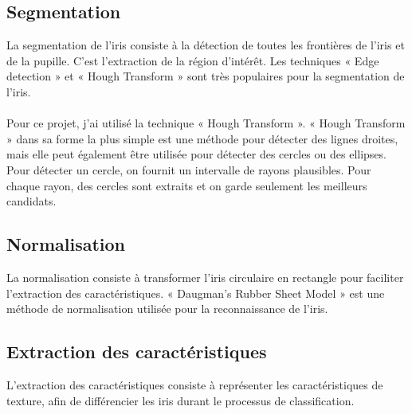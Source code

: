 \documentclass[12pt,twoside,letterpaper]{article}
\begin{document}
\subsection{Segmentation}
La segmentation de l’iris consiste à la détection de toutes les frontières de l’iris et de la pupille. C’est l’extraction de la région d’intérêt. Les techniques « Edge detection » et « Hough Transform » sont très populaires pour la segmentation de l’iris. 
\\~\\
Pour ce projet, j'ai utilisé la technique « Hough Transform ». « Hough Transform » dans sa forme la plus simple est une méthode pour détecter des lignes droites, mais elle peut également être utilisée pour détecter des cercles ou des ellipses. Pour détecter un cercle, on fournit un intervalle de rayons plausibles. Pour chaque rayon, des cercles sont extraits et on garde seulement les meilleurs candidats.\cite{ref_04}

\subsection{Normalisation}
La normalisation consiste à transformer l’iris circulaire en rectangle pour faciliter l’extraction des caractéristiques. « Daugman’s Rubber Sheet Model » est une méthode de normalisation utilisée pour la reconnaissance de l’iris.\cite{ref_01}\cite{ref_06}

\subsection{Extraction des caractéristiques}
L’extraction des caractéristiques consiste à représenter les caractéristiques de texture, afin de différencier les iris durant le processus de classification.\cite{ref_01}\cite{ref_06}
\end{document}
